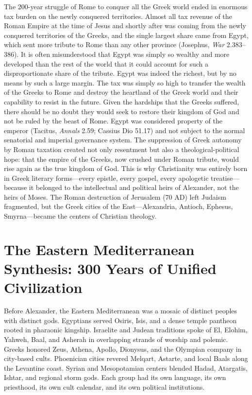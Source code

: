 The 200-year struggle of Rome to conquer all the Greek world ended in enormous tax burden on the newly conquered territories.
Almost all tax revenue of the Roman Empire at the time of Jesus and shortly after was coming from the newly conquered territories of the Greeks, and the single largest share came from Egypt, which sent more tribute to Rome than any other province (Josephus, \emph{War} 2.383--386).
It is often misunderstood that Egypt was simply so wealthy and more developed than the rest of the world that it could account for such a disproportionate share of the tribute.
Egypt was indeed the richest, but by no means by such a large margin.
The tax was simply so high to transfer the wealth of the Greeks to Rome and destroy the heartland of the Greek world and their capability to resist in the future.
Given the hardships that the Greeks suffered, there should be no doubt they would seek to restore their kingdom of God and not be ruled by the beast of Rome.
Egypt was considered property of the emperor (Tacitus, \emph{Annals} 2.59; Cassius Dio 51.17) and not subject to the normal senatorial and imperial governance system.
The suppression of Greek autonomy by Roman taxation created not only resentment but also a theological-political hope: that the empire of the Greeks, now crushed under Roman tribute, would rise again as the true kingdom of God.
This is why Christianity was entirely born in Greek literary forms---every epistle, every gospel, every apologetic treatise---because it belonged to the intellectual and political heirs of Alexander, not the heirs of Moses.
The Roman destruction of Jerusalem (70 AD) left Judaism fragmented, but the Greek cities of the East---Alexandria, Antioch, Ephesus, Smyrna---became the centers of Christian theology.

\section{The Eastern Mediterranean Synthesis: 300 Years of Unified Civilization}\label{sec:eastern-mediterranean-synthesis}

Before Alexander, the Eastern Mediterranean was a mosaic of distinct peoples with distinct gods.
Egyptians served Osiris, Isis, and a dense temple pantheon rooted in pharaonic kingship.
Israelite and Judean traditions spoke of El, Elohim, Yahweh, Baal, and Asherah in overlapping strands of worship and polemic.
Greeks honored Zeus, Athena, Apollo, Dionysus, and the Olympian company in city-based cults.
Phoenician cities revered Melqart, Astarte, and local Baals along the Levantine coast.
Syrian and Mesopotamian centers blended Hadad, Atargatis, Ishtar, and regional storm gods.
Each group had its own language, its own priesthood, its own cult calendar, and its own political institutions.


